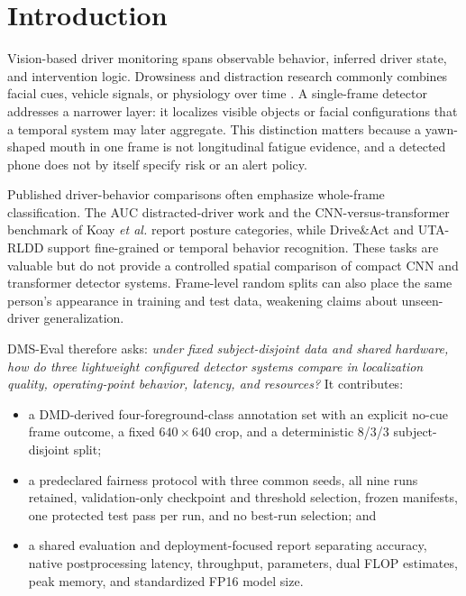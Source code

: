 \documentclass[conference]{IEEEtran}
\begin{document}
\section{Introduction}
Vision-based driver monitoring spans observable behavior, inferred driver state, and intervention logic. Drowsiness and distraction research commonly combines facial cues, vehicle signals, or physiology over time \cite{ramzan2019survey}. A single-frame detector addresses a narrower layer: it localizes visible objects or facial configurations that a temporal system may later aggregate. This distinction matters because a yawn-shaped mouth in one frame is not longitudinal fatigue evidence, and a detected phone does not by itself specify risk or an alert policy.

Published driver-behavior comparisons often emphasize whole-frame classification. The AUC distracted-driver work \cite{eraqi2019driver} and the CNN-versus-transformer benchmark of Koay \textit{et al.} \cite{koay2021benchmark} report posture categories, while Drive\&Act \cite{martin2019driveact} and UTA-RLDD \cite{ghoddoosian2019rldd} support fine-grained or temporal behavior recognition. These tasks are valuable but do not provide a controlled spatial comparison of compact CNN and transformer detector systems. Frame-level random splits can also place the same person's appearance in training and test data, weakening claims about unseen-driver generalization.

DMS-Eval therefore asks: \textit{under fixed subject-disjoint data and shared hardware, how do three lightweight configured detector systems compare in localization quality, operating-point behavior, latency, and resources?} It contributes:
\begin{itemize}
\item a DMD-derived \cite{ortega2020dmd} four-foreground-class annotation set with an explicit no-cue frame outcome, a fixed $640\times640$ crop, and a deterministic 8/3/3 subject-disjoint split;
\item a predeclared fairness protocol with three common seeds, all nine runs retained, validation-only checkpoint and threshold selection, frozen manifests, one protected test pass per run, and no best-run selection; and
\item a shared evaluation and deployment-focused report separating accuracy, native postprocessing latency, throughput, parameters, dual FLOP estimates, peak memory, and standardized FP16 model size.
\end{itemize}
\end{document}
